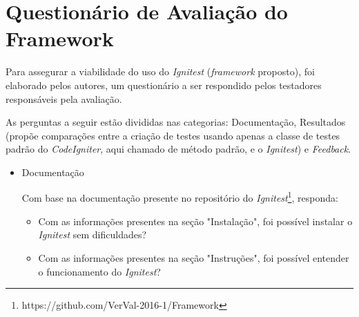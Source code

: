 \chapter{Questionário de Avaliação do Framework}
\label{questionario}

    Para assegurar a viabilidade do uso do \textit{Ignitest} (\textit{framework} proposto), foi elaborado pelos autores, um questionário a ser respondido pelos testadores responsáveis pela avaliação.
    
    As perguntas a seguir estão divididas nas categorias: Documentação, Resultados (propõe comparações entre a criação de testes usando apenas a classe de testes padrão do \textit{CodeIgniter}, aqui chamado de método padrão, e o \textit{Ignitest}) e \textit{Feedback}.
    
    \begin{itemize}
        \item Documentação
        
            Com base na documentação presente no repositório do \textit{Ignitest}\footnote{https://github.com/VerVal-2016-1/Framework}, responda:
            \begin{itemize}
                \item Com as informações presentes na seção "Instalação", foi possível instalar o \textit{Ignitest} sem dificuldades?
                \item Com as informações presentes na seção "Instruções", foi possível entender o funcionamento do \textit{Ignitest}?
            \end{itemize}
            

\end{itemize}
